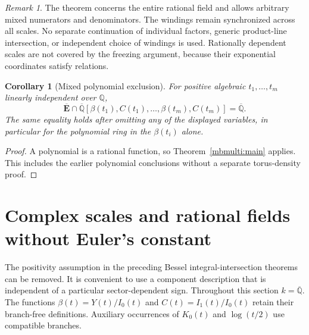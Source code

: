 \documentclass[11pt]{article}
\newtheorem{corollary}[theorem]{Corollary}
\theoremstyle{definition}
\theoremstyle{remark}
\newtheorem{remark}[theorem]{Remark}
\newcommand{\Qa}{\overline{\mathbb Q}}
\newcommand{\Ebar}{\overline{\mathbf E}}
\begin{document}
\begin{remark}
The theorem concerns the entire rational field and allows arbitrary
mixed numerators and denominators. The windings remain synchronized
across all scales. No separate continuation of individual factors,
generic product-line intersection, or independent choice of windings
is used. Rationally dependent scales are not covered by the freezing
argument, because their exponential coordinates satisfy relations.
\end{remark}


\begin{corollary}[Mixed polynomial exclusion]
\label{newmix:main}\label{thm:polynomial}
For positive algebraic $t_1,\ldots,t_m$ linearly independent over
$\mathbb Q$,
\[
 \Ebar\cap\Qa[\beta(t_1),C(t_1),\ldots,\beta(t_m),C(t_m)]=\Qa.
\]
The same equality holds after omitting any of the displayed variables,
in particular for the polynomial ring in the $\beta(t_i)$ alone.
\end{corollary}
\begin{proof}
A polynomial is a rational function, so Theorem~\ref{mbmulti:main}
applies.  This includes the earlier polynomial conclusions without
a separate torus-density proof.
\end{proof}



\section{Complex scales and rational fields without Euler's constant}
\label{cxi:section}

The positivity assumption in the preceding Bessel integral-intersection
theorems can be removed.  It is convenient to use a component description
that is independent of a particular sector-dependent sign.  Throughout
this section $k=\Qa$.  The functions $\beta(t)=Y(t)/I_0(t)$ and
$C(t)=I_1(t)/I_0(t)$ retain their branch-free definitions.  Auxiliary
occurrences of $K_0(t)$ and $\log(t/2)$ use compatible branches.
\end{document}
